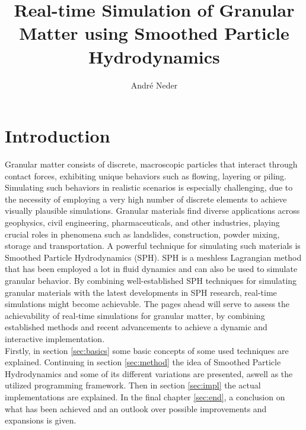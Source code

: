 \documentclass[intern]{cgMA}
\title{Real-time Simulation of Granular Matter using Smoothed Particle Hydrodynamics}
\author{André Neder}
\begin{document}
    \maketitle
    \newpage
    \tableofcontents
    \newpage
    \section{Introduction}

    Granular matter consists of discrete, macroscopic particles that interact through contact forces, exhibiting unique behaviors such as flowing, layering or piling. Simulating such behaviors in realistic scenarios is especially challenging, due to the necessity of employing a very high number of discrete elements to achieve visually plausible simulations. Granular materials find diverse applications across geophysics, civil engineering, pharmaceuticals, and other industries, playing crucial roles in phenomena such as landslides, construction, powder mixing, storage and transportation. A powerful technique for simulating such materials is Smoothed Particle Hydrodynamics (SPH). SPH is a meshless Lagrangian method that has been employed a lot in fluid dynamics and can also be used to simulate granular behavior. By combining well-established SPH techniques for simulating granular materials with the latest developments in SPH research, real-time simulations might become achievable. The pages ahead will serve to assess the achievability of real-time simulations for granular matter, by combining established methods and recent advancements to achieve a dynamic and interactive implementation.\\ 
    Firstly, in section \ref{sec:basics} some basic concepts of some used techniques are explained. Continuing in section \ref{sec:method} the idea of Smoothed Particle Hydrodynamics and some of its different variations are presented, aswell as the utilized programming framework. Then in section \ref{sec:impl} the actual implementations are explained. In the final chapter \ref{sec:end}, a conclusion on what has been achieved and an outlook over possible improvements and expansions is given. %
    \pagebreak
\end{document}
